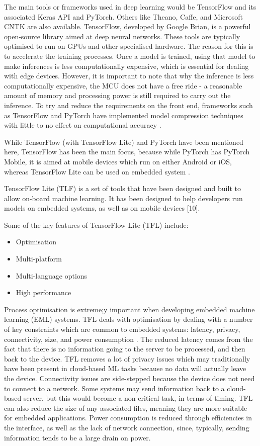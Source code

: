 \documentclass[conference]{IEEEtran}
\begin{document}
The main tools or frameworks used in deep learning would be TensorFlow and its associated Keras API and PyTorch. Others like Theano, Caffe, and Microsoft CNTK are also available. TensorFlow, developed by Google Brian, is a powerful open-source library aimed at deep neural networks. These tools are typically optimised to run on GPUs and other specialised hardware. The reason for this is to accelerate the training processes. Once a model is trained, using that model to make inferences is less computationally expensive, which is essential for dealing with edge devices. However, it is important to note that why the inference is less computationally expensive, the MCU does not have a free ride - a reasonable amount of memory and processing power is still required to carry out the inference. To try and reduce the requirements on the front end, frameworks such as TensorFlow and PyTorch have implemented model compression techniques with little to no effect on computational accuracy \cite{b9}. 

While TensorFlow (with TensorFlow Lite) and PyTorch have been mentioned here, TensorFlow has been the main focus, because while PyTorch has PyTorch Mobile, it is aimed at mobile devices which run on either Android or iOS, whereas TensorFlow Lite can be used on embedded system \cite{b9} \cite{b12}.

TensorFlow Lite (TLF) is a set of tools that have been designed and built to allow on-board machine learning. It has been designed to help developers run models on embedded systems, as well as on mobile devices [10].

Some of the key features of TensorFlow Lite (TFL) include:

\begin{itemize}
    \item Optimisation
    \item Multi-platform
    \item Multi-language options
    \item High performance
\end{itemize}

Process optimisation is extreme;y important when developing embedded machine learning (EML) systems. TFL deals with optimisation by dealing with a number of key constraints which are common to embedded systems: latency, privacy, connectivity, size, and power consumption \cite{b7}. The reduced latency comes from the fact that there is no information going to the server to be processed, and then back to the device. TFL removes a lot of privacy issues which may traditionally have been present in cloud-based ML tasks because no data will actually leave the device. Connectivity issues are side-stepped because the device does not need to connect to a network. Some systems may send information back to a cloud-based server, but this would become a non-critical task, in terms of timing. TFL can also reduce the size of any associated files, meaning they are more suitable for embedded applications. Power consumption is reduced through efficiencies in the interface, as well as the lack of network connection, since, typically, sending information tends to be a large drain on power.
\end{document}
